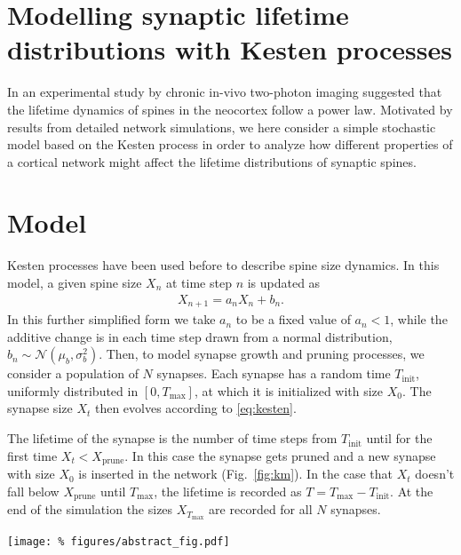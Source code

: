 \columnbreak
\section*{\LARGE Modelling synaptic lifetime distributions with Kesten processes}

In an experimental study by \textcite{Loewenstein2015} chronic in-vivo two-photon imaging suggested that the lifetime dynamics of spines in the neocortex follow a power law. Motivated by results from detailed network simulations, we here consider a simple stochastic model based on the Kesten process in order to analyze how different properties of a cortical network might affect the lifetime distributions of synaptic spines.

\vspace{-0.4cm}
\section*{Model}

Kesten processes have been used before \cite{Statman2014} to describe spine size dynamics. In this model, a given spine size $X_n$ at time step $n$ is updated as
%
\begin{align}
  X_{n+1} = a_n X_n + b_n. \label{eq:kesten}
\end{align}
%
In this further simplified form we take $a_n$ to be a fixed value of $a_n < 1$, while the additive change is in each time step drawn from a normal distribution, $b_n \sim \mathcal{N}(\mu_b, \sigma_b^2)$. Then, to model synapse growth and pruning processes, we consider a population of $N$ synapses. Each synapse has a random time $T_{\mathrm{init}}$, uniformly distributed in $[0,T_{\text{max}}]$, at which it is initialized with size $X_0$. The synapse size $X_t$ then evolves according to \eqref{eq:kesten}.

\medskip

The lifetime of the synapse is the number of time steps from $T_{\text{init}}$ until for the first time $X_t < X_{\mathrm{prune}}$. In this case the synapse gets pruned and a new synapse with size $X_0$ is inserted in the network (Fig.~\ref{fig:km}). In the case that $X_t$ doesn't fall below $X_{\mathrm{prune}}$ until $T_{\text{max}}$, the lifetime is recorded as $T=T_{\text{max}}-T_{\text{init}}$. At the end of the simulation the sizes $X_{T_{\text{max}}}$ are recorded for all $N$ synapses.

\begin{center}\vspace{1cm}
  \texttt{[image: \%
    figures/abstract\_fig.pdf]}
  \label{fig:km}
\end{center}\vspace{1cm}


